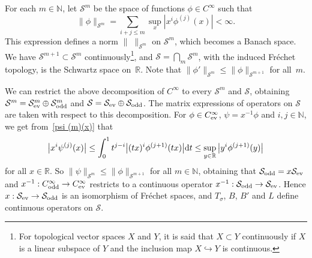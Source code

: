 \documentclass[11pt]{article}
\newcommand{\R}{\mathbb{R}}
\newcommand{\N}{\mathbb{N}}
\renewcommand{\SS}{\mathcal{S}}
\newcommand{\Cinf}{C^\infty}
\begin{document}
For each $m\in\N$, let $\SS^m$ be the space of functions $\phi\in\Cinf$ such that
  \[
    \|\phi\|_{\SS^m}=\sum_{i+j\le m}\sup_x|x^i\phi^{(j)}(x)|<\infty .
  \]
This expression def\/ines a norm $\|\; \|_{\SS^m}$ on $\SS^m$, which becomes a Banach space. We have \mbox{$\SS^{m+1}\subset\SS^m$} continuously\footnote{For topological vector spaces $X$ and $Y$, it is said that $X\subset Y$ continuously if $X$ is a linear subspace of $Y$ and the inclusion map $X\hookrightarrow Y$ is continuous.}, and $\SS=\bigcap_m\SS^m$, with the induced Fr\'echet topology, is the Schwartz space on~$\R$. Note that $\|\phi'\|_{\SS^m}\le\|\phi\|_{\SS^{m+1}}$ for all~$m$.

We can restrict the above decomposition of $\Cinf$ to every $\SS^m$ and $\SS$,
obtaining $\SS^m=\SS^m_{\text{\rm ev}}\oplus\SS^m_{\text{\rm odd}}$ and $\SS=\SS_{\text{\rm ev}}\oplus\SS_{\text{\rm odd}}$. The matrix expressions of operators on $\SS$ are taken with respect to this decomposition. For $\phi\in \Cinf_{\text{\rm ev}}$, $\psi=x^{-1}\phi$ and $i,j\in\N$, we get from~\eqref{psi (m)(x)} that
  \[
    \big|x^i\psi^{(j)}(x)\big|\le\int_0^1t^{j-i}\big|(tx)^i\phi^{(j+1)}(tx)\big|{\rm d}t\le\sup_{y\in\R}\big|y^i\phi^{(j+1)}(y)\big|
  \]
for all $x\in\R$. So $\|\psi\|_{\SS^m}\le\|\phi\|_{\SS^{m+1}}$ for all $m\in\N$, obtaining that $\SS_{\text{\rm odd}}=x \SS_{\text{\rm ev}}$ and $x^{-1}:\Cinf_{\text{\rm odd}}\to \Cinf_{\text{\rm ev}}$ restricts to a continuous operator $x^{-1}:\SS_{\text{\rm odd}}\to\SS_{\text{\rm ev}}$. Hence $x:\SS_{\text{\rm ev}}\to\SS_{\text{\rm odd}}$ is an isomorphism of Fr\'echet spaces, and $T_\sigma$, $B$, $B'$ and $L$ def\/ine continuous operators on $\SS$.
\end{document}
